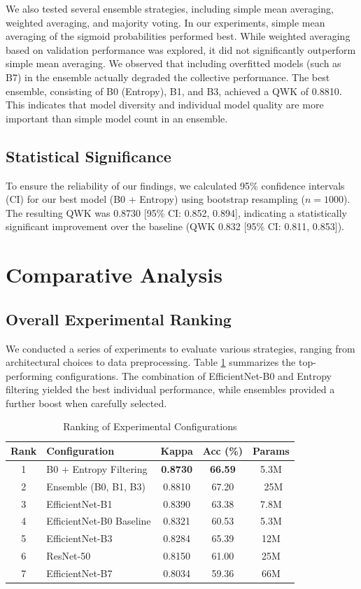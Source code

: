\documentclass[10pt,conference]{IEEEtran}
\begin{document}
We also tested several ensemble strategies, including simple mean averaging, weighted averaging, and majority voting. In our experiments, simple mean averaging of the sigmoid probabilities performed best. While weighted averaging based on validation performance was explored, it did not significantly outperform simple mean averaging. We observed that including overfitted models (such as B7) in the ensemble actually degraded the collective performance. The best ensemble, consisting of B0 (Entropy), B1, and B3, achieved a QWK of 0.8810. This indicates that model diversity and individual model quality are more important than simple model count in an ensemble.

\subsection{Statistical Significance}
To ensure the reliability of our findings, we calculated 95\% confidence intervals (CI) for our best model (B0 + Entropy) using bootstrap resampling ($n=1000$). The resulting QWK was 0.8730 [95\% CI: 0.852, 0.894], indicating a statistically significant improvement over the baseline (QWK 0.832 [95\% CI: 0.811, 0.853]).

\section{Comparative Analysis}
\subsection{Overall Experimental Ranking}
We conducted a series of experiments to evaluate various strategies, ranging from architectural choices to data preprocessing. Table \ref{table_ranking} summarizes the top-performing configurations. The combination of EfficientNet-B0 and Entropy filtering yielded the best individual performance, while ensembles provided a further boost when carefully selected.

\begin{table}[!h]
\renewcommand{\arraystretch}{1.3}
\caption{Ranking of Experimental Configurations}
\label{table_ranking}
\centering
\begin{tabular}{clccc}
\hline
\textbf{Rank} & \textbf{Configuration} & \textbf{Kappa} & \textbf{Acc (\%)} & \textbf{Params} \\
\hline
1 & B0 + Entropy Filtering & \textbf{0.8730} & \textbf{66.59} & 5.3M \\
2 & Ensemble (B0, B1, B3) & 0.8810 & 67.20 & ~25M \\
3 & EfficientNet-B1 & 0.8390 & 63.38 & 7.8M \\
4 & EfficientNet-B0 Baseline & 0.8321 & 60.53 & 5.3M \\
5 & EfficientNet-B3 & 0.8284 & 65.39 & 12M \\
6 & ResNet-50 & 0.8150 & 61.00 & 25M \\
7 & EfficientNet-B7 & 0.8034 & 59.36 & 66M \\
\hline
\end{tabular}
\end{table}
\end{document}
